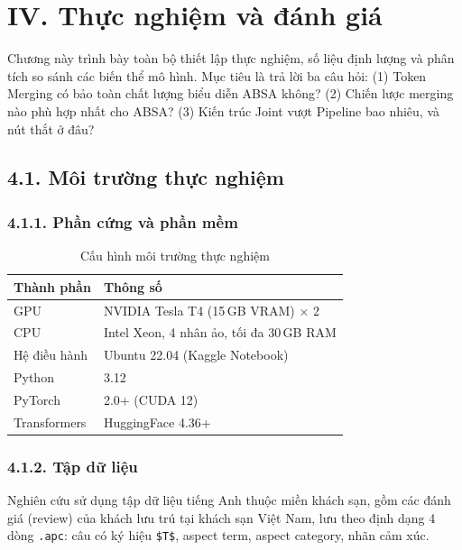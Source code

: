 \chapter{IV. Thực nghiệm và đánh giá}
\label{chap:ketqua}

Chương này trình bày toàn bộ thiết lập thực nghiệm, số liệu định lượng
và phân tích so sánh các biến thể mô hình. Mục tiêu là trả lời ba câu
hỏi: (1) Token Merging có bảo toàn chất lượng biểu diễn ABSA không?
(2) Chiến lược merging nào phù hợp nhất cho ABSA? (3) Kiến trúc Joint
vượt Pipeline bao nhiêu, và nút thắt ở đâu?

\section{4.1.\; Môi trường thực nghiệm}
\label{sec:exp_setup}

\subsection{4.1.1.\; Phần cứng và phần mềm}

\begin{table}[H]
\centering
\caption{Cấu hình môi trường thực nghiệm}
\label{tab:env}
\begin{tabular}{@{}ll@{}}
\toprule
\textbf{Thành phần} & \textbf{Thông số} \\
\midrule
GPU  & NVIDIA Tesla T4 (15\,GB VRAM) $\times$ 2 \\
CPU  & Intel Xeon, 4 nhân ảo, tối đa 30\,GB RAM \\
Hệ điều hành & Ubuntu 22.04 (Kaggle Notebook) \\
Python & 3.12 \\
PyTorch & 2.0+ (CUDA 12) \\
Transformers & HuggingFace 4.36+ \\
\bottomrule
\end{tabular}
\end{table}

\subsection{4.1.2.\; Tập dữ liệu}

Nghiên cứu sử dụng tập dữ liệu tiếng Anh thuộc miền khách sạn, gồm
các đánh giá (review) của khách lưu trú tại khách sạn Việt Nam,
lưu theo định dạng 4 dòng \texttt{.apc}: câu có ký hiệu \texttt{\$T\$},
aspect term, aspect category, nhãn cảm xúc.

